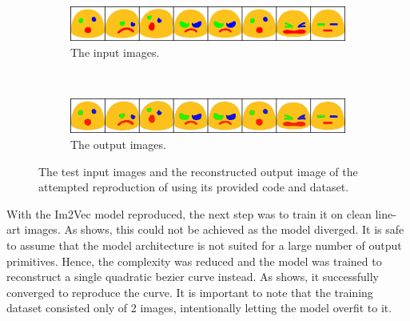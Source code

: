 \begin{figure}
    \centering
    \begin{subfigure}{\textwidth}
        \includegraphics[width=\textwidth]{graphics/work-artifacts/im2vec/114/real_img_VectorVAEnLayers_0574.png}
        \caption{The input images.}
    \end{subfigure} \\
    \begin{subfigure}{\textwidth}
        \includegraphics[width=\textwidth]{graphics/work-artifacts/im2vec/114/recons_VectorVAEnLayers_0574.png}
        \caption{The output images.}
    \end{subfigure}
    \caption{The test input images and the reconstructed output image of the attempted reproduction of \citep{DBLP:conf/cvpr/Reddy21} using its provided code and dataset.}
    \label{fig:114.recons}
\end{figure}

With the Im2Vec \citep{DBLP:conf/cvpr/Reddy21} model reproduced, the next step was to train it on clean line-art images. As  shows, this could not be achieved as the model diverged. It is safe to assume that the model architecture is not suited for a large number of output primitives. Hence, the complexity was reduced and the model was trained to reconstruct a single quadratic bezier curve instead. As  shows, it successfully converged to reproduce the curve. It is important to note that the training dataset consisted only of 2 images, intentionally letting the model overfit to it.

